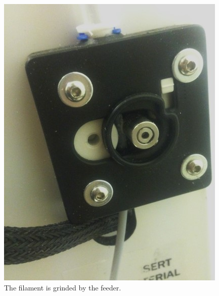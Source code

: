 \begin{figure}[htbp]
  \centering
  \includegraphics[scale=0.6]{Figs5//feeder.JPG}
  \caption[The filament is grinded by the feeder]{\footnotesize The filament is grinded by the feeder.}
  \label{Fig:feeder}
\end{figure}

